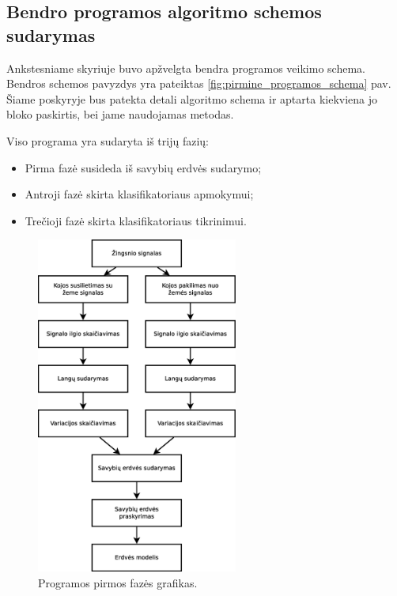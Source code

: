 \documentclass[]{vgtuef}
\begin{document}
\subsection{Bendro programos algoritmo schemos sudarymas}
\label{subsec:total_scheme}

Ankstesniame skyriuje buvo apžvelgta bendra programos veikimo schema. Bendros schemos pavyzdys yra pateiktas \ref{fig:pirmine_programos_schema} pav. Šiame  poskyryje bus patekta detali algoritmo schema ir aptarta kiekviena jo bloko paskirtis, bei jame naudojamas metodas.

Viso programa yra sudaryta iš trijų fazių:

\begin{itemize}
\item Pirma fazė susideda iš savybių erdvės sudarymo;
\item Antroji fazė skirta klasifikatoriaus apmokymui;
\item Trečioji fazė skirta klasifikatoriaus tikrinimui.
\end{itemize}

\begin{figure}[!t]
  \centering
  \includegraphics[width=250px]{figures/pirma_faze.eps}
  \caption{Programos pirmos fazės grafikas.}
  \label{fig:pirma_faze}
\end{figure}
\end{document}
